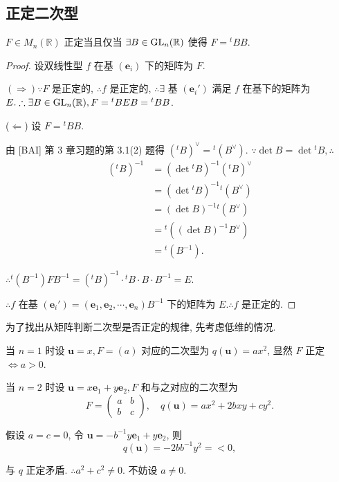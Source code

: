 \documentclass[color=black,device=normal,lang=cn,mode=geye]{elegantnote}
\begin{document}
\subsection{正定二次型}
\begin{theorem}[书上的定理 6]
    $F\in M_n(\mathbb{R})$ 正定当且仅当 $\exists B\in\operatorname{GL} _n(\mathbb{R})$ 使得 $F={}^tBB$.
\end{theorem}
\begin{proof}
    设双线性型 $f$ 在基 $(\boldsymbol{e}_i)$ 下的矩阵为 $F$.
    
    $(\Rightarrow)\because F$ 是正定的, $\therefore f$ 是正定的, $\therefore\exists$ 基 $(\boldsymbol{e}_i')$ 满足 $f$ 在基下的矩阵为 $E.\therefore\exists B\in\operatorname{GL} _n(\mathbb{R}),F={}^tBEB={}^tBB$.

    ($\Leftarrow$) 设 $F={}^tBB$.

    由 [BAI] 第 3 章习题的第 3.1(2) 题得 $({}^tB)^\vee={}^t(B^\vee)$. $\because\det B=\det{}^tB,\therefore$
    \begin{align*}
        ({}^tB)^{-1} & =(\det{}^tB)^{-1}({}^tB)^\vee \\
        & =(\det{}^tB)^{-1}{}^t(B^\vee) \\
        & =(\det B)^{-1}{}^t(B^\vee) \\
        & ={}^t((\det B)^{-1}B^\vee) \\
        & ={}^t(B^{-1}).
    \end{align*}

    $\therefore{}^t(B^{-1})FB^{-1}=({}^tB)^{-1}\cdot{}^tB\cdot B\cdot B^{-1}=E$.

    $\therefore f$ 在基 $(\boldsymbol{e}_i')=(\boldsymbol{e}_1,\boldsymbol{e}_2,\cdots,\boldsymbol{e}_n)B^{-1}$ 下的矩阵为 $E.\therefore f$ 是正定的.
\end{proof}
为了找出从矩阵判断二次型是否正定的规律, 先考虑低维的情况.

当 $n=1$ 时设 $\boldsymbol{u}=x,F=(a)$ 对应的二次型为 $q(\boldsymbol{u})=ax^2$, 显然 $F$ 正定 $\Leftrightarrow a>0$.

当 $n=2$ 时设 $\boldsymbol{u}=x\boldsymbol{e}_1+y\boldsymbol{e}_2,F$ 和与之对应的二次型为
\[F=\begin{pmatrix}
    a & b \\
    b & c
\end{pmatrix},\quad q(\boldsymbol{u})=ax^2+2bxy+cy^2.\]

假设 $a=c=0$, 令 $\boldsymbol{u}=-b^{-1}y\boldsymbol{e}_1+y\boldsymbol{e}_2$, 则
\[q(\boldsymbol{u})=-2bb^{-1}y^2=<0,\]

与 $q$ 正定矛盾. $\therefore a^2+c^2\neq0$. 不妨设 $a\neq0$.
\end{document}
